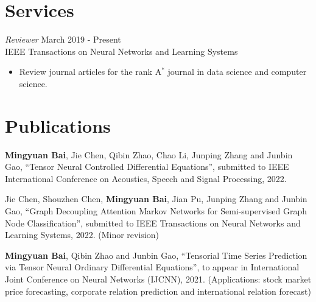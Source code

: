 \documentclass[margin, 11pt]{res} %
\begin{document}
\begin{resume}
\section{Services}
{\sl Reviewer} \hfill March 2019 - Present \\
{IEEE Transactions on Neural Networks and Learning Systems}
\begin{itemize}
\item Review journal articles for the rank A$^*$ journal in data science and computer science.
\end{itemize}

\newpage
\section{Publications}
\textbf{Mingyuan Bai}, Jie Chen, Qibin Zhao, Chao Li, Junping Zhang and Junbin Gao, ``Tensor Neural Controlled Differential Equations'', submitted to IEEE International Conference on Acoustics, Speech and Signal Processing, 2022.

Jie Chen, Shouzhen Chen, \textbf{Mingyuan Bai}, Jian Pu, Junping Zhang and Junbin Gao, ``Graph Decoupling Attention Markov Networks for Semi-supervised Graph Node Classification'', submitted to IEEE Transactions on Neural Networks and Learning Systems, 2022. (Minor revision)

\textbf{Mingyuan Bai}, Qibin Zhao and Junbin Gao, ``Tensorial Time Series Prediction via Tensor Neural Ordinary Differential Equations'', to appear in International Joint Conference on Neural Networks (IJCNN), 2021. (Applications: stock market price forecasting, corporate relation prediction and international relation forecast)


\end{resume}
\end{document}
